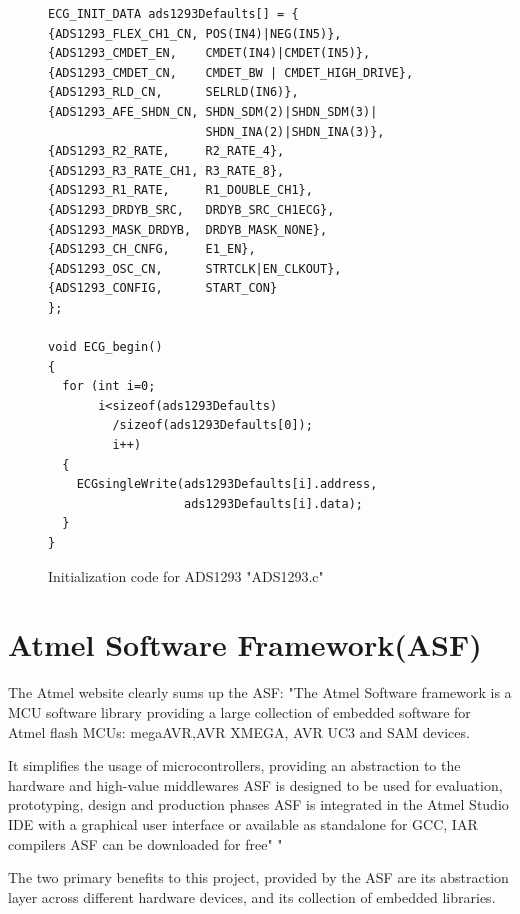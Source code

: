\begin{figure}
	\begin{center}
		\label{fig:ADS1293_INIT}
\begin{lstlisting}[frame=single,morekeywords={ECG_INIT_DATA}]
ECG_INIT_DATA ads1293Defaults[] = {
{ADS1293_FLEX_CH1_CN, POS(IN4)|NEG(IN5)}, 
{ADS1293_CMDET_EN,    CMDET(IN4)|CMDET(IN5)},
{ADS1293_CMDET_CN,    CMDET_BW | CMDET_HIGH_DRIVE},
{ADS1293_RLD_CN,      SELRLD(IN6)},
{ADS1293_AFE_SHDN_CN, SHDN_SDM(2)|SHDN_SDM(3)|
                      SHDN_INA(2)|SHDN_INA(3)},
{ADS1293_R2_RATE,     R2_RATE_4},
{ADS1293_R3_RATE_CH1, R3_RATE_8},
{ADS1293_R1_RATE,     R1_DOUBLE_CH1},
{ADS1293_DRDYB_SRC,   DRDYB_SRC_CH1ECG},
{ADS1293_MASK_DRDYB,  DRDYB_MASK_NONE},
{ADS1293_CH_CNFG,     E1_EN},
{ADS1293_OSC_CN,      STRTCLK|EN_CLKOUT},
{ADS1293_CONFIG,      START_CON}
};

void ECG_begin()
{
  for (int i=0;
       i<sizeof(ads1293Defaults)
         /sizeof(ads1293Defaults[0]);
         i++)
  {
    ECGsingleWrite(ads1293Defaults[i].address,
                   ads1293Defaults[i].data);
  }
}
\end{lstlisting}
		\caption{Initialization code for ADS1293 "ADS1293.c"}
	\end{center}
\end{figure}



\section{Atmel Software Framework(ASF)}
The Atmel website clearly sums up the ASF:
"The Atmel Software framework is a MCU software library providing a large collection of embedded software for Atmel flash MCUs: megaAVR,AVR XMEGA, AVR UC3 and SAM devices.

It  simplifies the usage of microcontrollers, providing an abstraction to the hardware and high-value middlewares
ASF is designed to be used for evaluation, prototyping, design and production phases
ASF is integrated in the Atmel Studio IDE with a graphical user interface or available as standalone for GCC, IAR compilers
ASF can be downloaded for free" " 

The two primary benefits to this project, provided by the ASF are its abstraction layer across different hardware devices, and its collection of embedded libraries.

